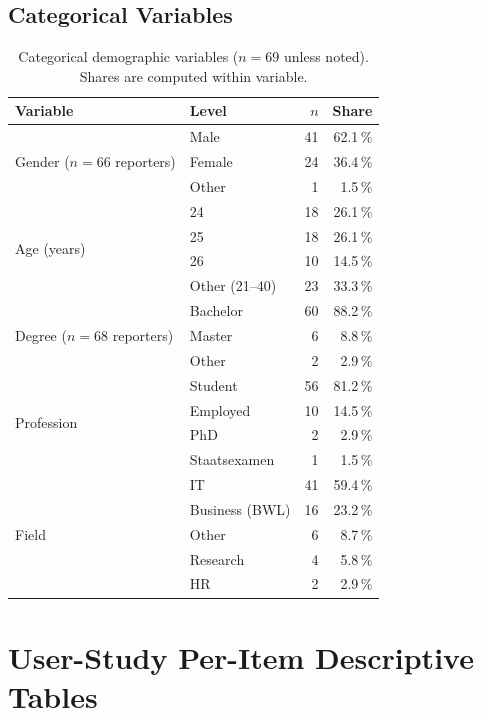 \subsection{Categorical Variables}
\label{app:demographics-categorical}

\begin{table}[H]
\centering
\small
\begin{tabular}{@{}l l r r@{}}
\toprule
Variable & Level & $n$ & Share \\
\midrule
\multirow{3}{*}{Gender ($n = 66$ reporters)}
  & Male           & 41 & 62.1\,\% \\
  & Female         & 24 & 36.4\,\% \\
  & Other          &  1 & \phantom{0}1.5\,\% \\
\midrule
\multirow{4}{*}{Age (years)}
  & 24             & 18 & 26.1\,\% \\
  & 25             & 18 & 26.1\,\% \\
  & 26             & 10 & 14.5\,\% \\
  & Other (21--40) & 23 & 33.3\,\% \\
\midrule
\multirow{3}{*}{Degree ($n = 68$ reporters)}
  & Bachelor       & 60 & 88.2\,\% \\
  & Master         &  6 & \phantom{0}8.8\,\% \\
  & Other          &  2 & \phantom{0}2.9\,\% \\
\midrule
\multirow{4}{*}{Profession}
  & Student        & 56 & 81.2\,\% \\
  & Employed       & 10 & 14.5\,\% \\
  & PhD            &  2 & \phantom{0}2.9\,\% \\
  & Staatsexamen   &  1 & \phantom{0}1.5\,\% \\
\midrule
\multirow{5}{*}{Field}
  & IT             & 41 & 59.4\,\% \\
  & Business (BWL) & 16 & 23.2\,\% \\
  & Other          &  6 & \phantom{0}8.7\,\% \\
  & Research       &  4 & \phantom{0}5.8\,\% \\
  & HR             &  2 & \phantom{0}2.9\,\% \\
\bottomrule
\end{tabular}
\caption{Categorical demographic variables ($n = 69$ unless noted).
Shares are computed within variable.}
\label{tab:demographics-categorical}
\end{table}


\section{User-Study Per-Item Descriptive Tables}
\label{app:user-study-items}

